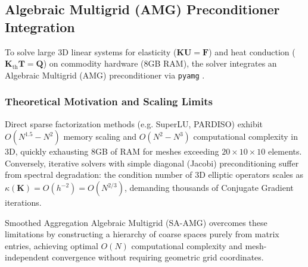 \documentclass[11pt, a4paper]{article}
\begin{document}
\subsection{Algebraic Multigrid (AMG) Preconditioner Integration}
\label{sec:amg}
To solve large 3D linear systems for elasticity ($\mathbf{K} \mathbf{U} = \mathbf{F}$) and heat conduction ($\mathbf{K}_{\text{th}} \mathbf{T} = \mathbf{Q}$) on commodity hardware (8GB RAM), the solver integrates an Algebraic Multigrid (AMG) preconditioner via \texttt{pyamg} \cite{bell2012}.

\subsubsection{Theoretical Motivation and Scaling Limits}
Direct sparse factorization methods (e.g. SuperLU, PARDISO) exhibit $O(N^{1.5}-N^2)$ memory scaling and $O(N^2-N^3)$ computational complexity in 3D, quickly exhausting 8GB of RAM for meshes exceeding $20 \times 10 \times 10$ elements. Conversely, iterative solvers with simple diagonal (Jacobi) preconditioning suffer from spectral degradation: the condition number of 3D elliptic operators scales as $\kappa(\mathbf{K}) = O(h^{-2}) = O(N^{2/3})$, demanding thousands of Conjugate Gradient iterations.

Smoothed Aggregation Algebraic Multigrid (SA-AMG) \cite{vanek1996} overcomes these limitations by constructing a hierarchy of coarse spaces purely from matrix entries, achieving optimal $O(N)$ computational complexity and mesh-independent convergence without requiring geometric grid coordinates.
\end{document}
